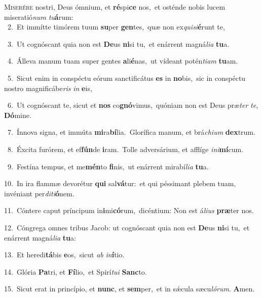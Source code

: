 \lettrine{\initial\textcolor{\initialcolor}{M}}{iserére} nostri, Deus ómnium, et \textbf{ré}\-spi\textbf{ce} nos,~\star et osténde nobis lucem miseratió\textit{num} \textit{tu}\-\textbf{á}rum:\\
{\numbfont\textcolor{\numbcolor}{~2.}}~Et immítte timórem tuum \textbf{su}\-per \textbf{gen}\-tes,~\star quæ non ex\-\textit{qui}\-\textit{si}\textbf{é}runt te,\par
{\numbfont\textcolor{\numbcolor}{~3.}}~Ut cognóscant quia non est \textbf{De}\-us \textbf{ni}\-si tu,~\star et enárrent magná\-\textit{li}\-\textit{a} \textbf{tu}\-a.\par
{\numbfont\textcolor{\numbcolor}{~4.}}~Álleva manum tuam super gentes \textbf{a}\-li\-\textbf{é}\-nas,~\star ut vídeant potén\-\textit{ti}\-\textit{am} \textbf{tu}\-am.\par
{\numbfont\textcolor{\numbcolor}{~5.}}~Sicut enim in conspéctu eórum sanctificátus \textbf{es} in \textbf{no}\-bis,~\star sic in conspéctu nostro magnificábe\textit{ris} \textit{in} \textbf{e}\-is,\par
{\numbfont\textcolor{\numbcolor}{~6.}}~Ut cognóscant te, sicut et \textbf{nos} co\-\textbf{gnó}\-vimus,~\star quóniam non est Deus præ\textit{ter} \textit{te}\-, \textbf{Dó}\-mine.\par
{\numbfont\textcolor{\numbcolor}{~7.}}~Ínnova signa, et immúta \textbf{mi}\-ra\-\textbf{bí}\-lia.~\star Glorífica manum, et brá\-\textit{chi}\-\textit{um} \textbf{dex}\-trum.\par
{\numbfont\textcolor{\numbcolor}{~8.}}~Éxcita furórem, et ef\-\textbf{fún}\-de \textbf{i}\-ram.~\star Tolle adversárium, et afflíge \textit{in}\-\textit{i}\textbf{mí}cum.\par
{\numbfont\textcolor{\numbcolor}{~9.}}~Festína tempus, et me\-\textbf{mén}\-to \textbf{fi}\-nis,~\star ut enárrent mirabí\-\textit{li}\-\textit{a} \textbf{tu}\-a.\par
{\numbfont\textcolor{\numbcolor}{10.}}~In ira flammæ devorétur \textbf{qui} sal\-\textbf{vá}\-tur:~\star et qui péssimant plebem tuam, invéniant per\-\textit{di}\-\textit{ti}\textbf{ó}nem.\par
{\numbfont\textcolor{\numbcolor}{11.}}~Cóntere caput príncipum in\-\textbf{i}\-mi\-\textbf{có}\-rum,~\star dicéntium: Non est á\-\textit{li}\-\textit{us} \textbf{præ}\-ter nos.\par
{\numbfont\textcolor{\numbcolor}{12.}}~Cóngrega omnes tribus Jacob: ut cognóscant quia non est \textbf{De}\-us \textbf{ni}\-si tu,~\star et enárrent magná\-\textit{li}\-\textit{a} \textbf{tu}\-a:\par
{\numbfont\textcolor{\numbcolor}{13.}}~Et heredi\-\textbf{tá}\-bis \textbf{e}\-os,~\star sicut \textit{ab} \textit{in}\-\textbf{í}tio.\par
{\numbfont\textcolor{\numbcolor}{14.}}~Glória \textbf{Pa}\-tri, et \textbf{Fí}\-lio,~\star et Spirí\-\textit{tu}\-\textit{i} \textbf{Sanc}\-to.\par
{\numbfont\textcolor{\numbcolor}{15.}}~Sicut erat in princípio, et \textbf{nunc}\-, et \textbf{sem}\-per,~\star et in sǽcula sæcu\-\textit{ló}\-\textit{rum}. \textbf{A}\-men.\par
